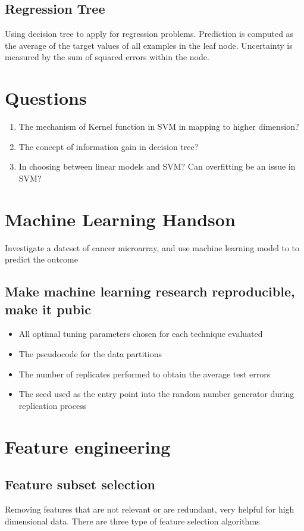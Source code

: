 \documentclass[11pt]{article}
\begin{document}
\subsection{Regression Tree}
\label{sec:org1cd8db4}
Using decision tree to apply for regression problems. Prediction is computed as the average of the target values of all examples in the leaf node. Uncertainty is measured by the sum of squared errors within the node.

\section{Questions}
\label{sec:org2a06606}
\begin{enumerate}
\item The mechanism of Kernel function in SVM in mapping to higher dimension?
\item The concept of information gain in decision tree?
\item In choosing between linear models and SVM? Can overfitting be an issue in SVM?
\end{enumerate}

\section{Machine Learning Handson}
\label{sec:orgc038330}
Investigate a dateset of cancer microarray, and use machine learning model to to predict the outcome   
\subsection{Make machine learning research reproducible, make it pubic}
\label{sec:org528d9a7}
\begin{itemize}
\item All optimal tuning parameters chosen for each technique evaluated
\item The pseudocode for the data partitions
\item The number of replicates performed to obtain the average test errors
\item The seed used as the entry point into the random number generator during replication process
\end{itemize}
\section{Feature engineering}
\label{sec:org98f8030}
\subsection{Feature subset selection}
\label{sec:orgd9aa744}
Removing features that are not relevant or are redundant, very helpful for high dimensional data. There are three type of feature selection algorithms
\end{document}
